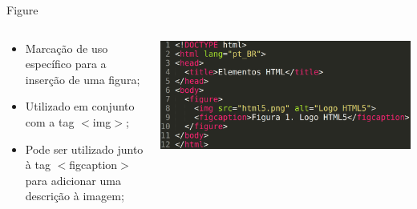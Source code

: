 \documentclass{beamer}
\begin{document}
\begin{frame}{Figure}
    \begin{columns}
    \begin{column}{0.4 \textwidth}
      \small
     \begin{itemize}
      \item Marcação de uso específico para a inserção de uma figura;
       \item Utilizado em conjunto com a tag $<$img$>$;
       \item Pode ser utilizado junto à tag $<$figcaption$>$ para 
adicionar uma descrição à imagem;
     \end{itemize}
    \end{column}
    
    \begin{column}{0.55\textwidth}
     \includegraphics[height=0.3\paperheight]{fig/aula2/aula4_1.png}
    \end{column}
  \end{columns}
\end{frame}
\end{document}
